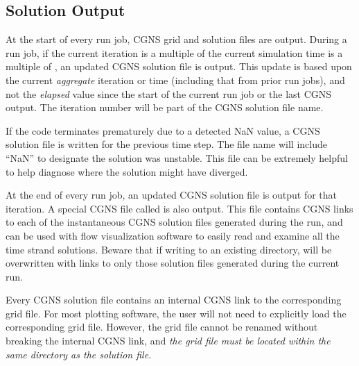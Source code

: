 \subsection{Solution Output}
\label{SEC:Files:Solution_Output}


At the start of every run job, CGNS grid and solution files are output.
%
% 
During a run job, if the current iteration is a multiple of
\andor the current simulation time is a multiple of
,
an updated CGNS solution file is output.
%
This update is based upon the current {\em aggregate} iteration or time
(including that from prior run jobs),
and not the {\em elapsed} value since the start of the current
run job or the last CGNS output.
%
The iteration number will be part of the CGNS solution file name.


If the code terminates prematurely due to a detected NaN value,
a CGNS solution file is written for the previous time step.
%
The file name will include ``NaN'' to designate the solution was
unstable.
%
This file can be extremely helpful to help diagnose where the solution might
have diverged.


At the end of every run job, an updated CGNS solution file is output
for that iteration.
%
A special CGNS file called  is also output.
%
This file contains CGNS links to each of the instantaneous CGNS
solution files generated during the run, and can be used with flow
visualization software to easily read and examine all the time strand
solutions.
%
Beware that if writing to an existing directory, 
will be overwritten with links to only those solution files generated
during the current run. 


Every CGNS solution file contains an internal CGNS link to the
corresponding grid file.
%
For most plotting software, the user will not need to explicitly
load the corresponding grid file.
%
However, the grid file cannot be renamed without breaking the internal CGNS
link, and \emph{the grid file must be located within the same directory as the
solution file}.

